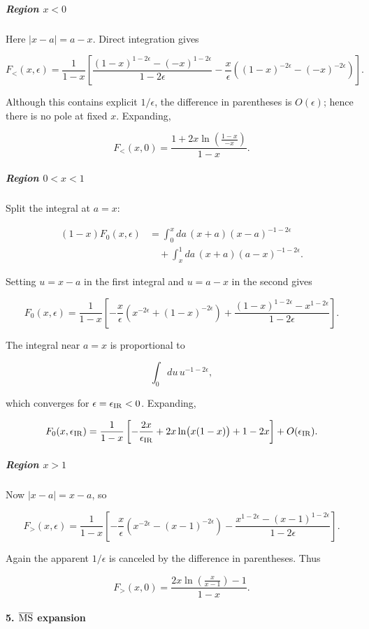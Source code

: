 \subparagraph*{Region $x<0$}

Here $|x-a|=a-x$. Direct integration gives

\[
F_{<}(x,\epsilon) = \frac1{1-x} \left[ \frac{(1-x)^{1-2\epsilon}-(-x)^{1-2\epsilon}} {1-2\epsilon} -\frac{x}{\epsilon} \left((1-x)^{-2\epsilon}-(-x)^{-2\epsilon}\right) \right].
\]

Although this contains explicit $1/\epsilon$, the difference in parentheses is $O(\epsilon)$; hence there is no pole at fixed $x$. Expanding,

\[
F_{<}(x,0) = \frac{1+2x\ln\left(\frac{1-x}{-x}\right)}{1-x}.
\]

\subparagraph*{Region $0<x<1$}

Split the integral at $a=x$:

\[
\begin{aligned}
(1-x)F_0(x,\epsilon)
&=
\int_0^x da\,(x+a)(x-a)^{-1-2\epsilon}
\\
&\quad+
\int_x^1 da\,(x+a)(a-x)^{-1-2\epsilon}.
\end{aligned}
\]

Setting $u=x-a$ in the first integral and $u=a-x$ in the second gives

\[
F_0(x,\epsilon) = \frac1{1-x} \left[ -\frac{x}{\epsilon} \left(x^{-2\epsilon}+(1-x)^{-2\epsilon}\right) + \frac{(1-x)^{1-2\epsilon}-x^{1-2\epsilon}} {1-2\epsilon} \right].
\]

The integral near $a=x$ is proportional to

\[
\int_0du\,u^{-1-2\epsilon},
\]

which converges for $\epsilon=\epsilon_{\rm IR}<0$. Expanding,

\[
F_0(x,\epsilon_{\rm IR}) = \frac1{1-x} \left[ -\frac{2x}{\epsilon_{\rm IR}} +2x\ln\bigl(x(1-x)\bigr) +1-2x \right] +O(\epsilon_{\rm IR}).
\]

\subparagraph*{Region $x>1$}

Now $|x-a|=x-a$, so

\[
F_{>}(x,\epsilon) = \frac1{1-x} \left[ -\frac{x}{\epsilon} \left(x^{-2\epsilon}-(x-1)^{-2\epsilon}\right) -\frac{x^{1-2\epsilon}-(x-1)^{1-2\epsilon}} {1-2\epsilon} \right].
\]

Again the apparent $1/\epsilon$ is canceled by the difference in parentheses. Thus

\[
F_{>}(x,0) = \frac{2x\ln\left(\frac{x}{x-1}\right)-1}{1-x}.
\]

\paragraph*{5. $\overline{\rm MS}$ expansion}

